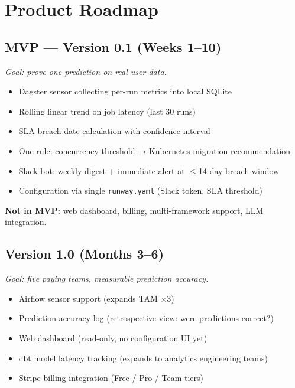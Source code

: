 
\section{Product Roadmap}

\subsection{MVP — Version 0.1 (Weeks 1--10)}

\textit{Goal: prove one prediction on real user data.}

\begin{itemize}
  \item Dagster sensor collecting per-run metrics into local SQLite
  \item Rolling linear trend on job latency (last 30 runs)
  \item SLA breach date calculation with confidence interval
  \item One rule: concurrency threshold → Kubernetes migration recommendation
  \item Slack bot: weekly digest + immediate alert at $\leq$14-day breach window
  \item Configuration via single \texttt{runway.yaml} (Slack token, SLA threshold)
\end{itemize}

\textbf{Not in MVP:} web dashboard, billing, multi-framework support, LLM integration.

\subsection{Version 1.0 (Months 3--6)}

\textit{Goal: five paying teams, measurable prediction accuracy.}

\begin{itemize}
  \item Airflow sensor support (expands TAM $\times$3)
  \item Prediction accuracy log (retrospective view: were predictions correct?)
  \item Web dashboard (read-only, no configuration UI yet)
  \item dbt model latency tracking (expands to analytics engineering teams)
  \item Stripe billing integration (Free / Pro / Team tiers)
\end{itemize}

